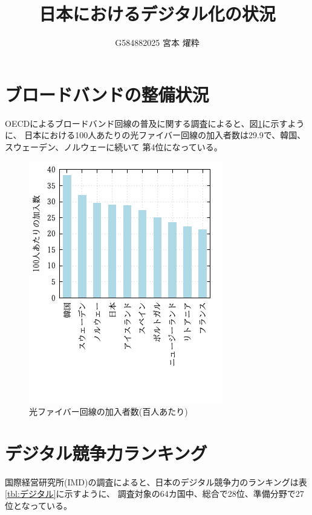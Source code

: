 \documentclass[a4paper,11pt,dvipdfmx]{ujarticle}
\title{日本におけるデジタル化の状況}
\author{G584882025 宮本 燿粋}
\begin{document}
\maketitle %

\section{ブロードバンドの整備状況}
OECDによるブロードバンド回線の普及に関する調査\cite{oecd}によると、図\ref{fig:ランキング}に示すように、
日本における100人あたりの光ファイバー回線の加入者数は29.9で、韓国、スウェーデン、ノルウェーに続いて
第4位になっている。


\begin{figure}[htbp]
    \centering
    \includegraphics{fig11.png}
    \caption{光ファイバー回線の加入者数(百人あたり)}\label{fig:ランキング}
\end{figure}


\section{デジタル競争力ランキング}

国際経営研究所(IMD)の調査\cite{imd}によると、日本のデジタル競争力のランキングは表\ref{tbl:デジタル}に示すように、
調査対象の64カ国中、総合で28位、準備分野で27位となっている。
\end{document}

